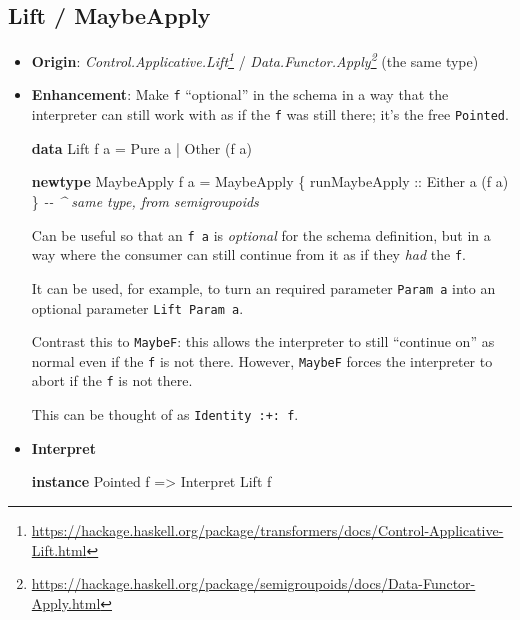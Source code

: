 \documentclass[]{article}
\newenvironment{Shaded}{}{}
\newcommand{\CommentTok}[1]{\textcolor[rgb]{0.38,0.63,0.69}{\textit{#1}}}
\newcommand{\DataTypeTok}[1]{\textcolor[rgb]{0.56,0.13,0.00}{#1}}
\newcommand{\KeywordTok}[1]{\textcolor[rgb]{0.00,0.44,0.13}{\textbf{#1}}}
\newcommand{\NormalTok}[1]{#1}
\newcommand{\OperatorTok}[1]{\textcolor[rgb]{0.40,0.40,0.40}{#1}}
\newcommand{\OtherTok}[1]{\textcolor[rgb]{0.00,0.44,0.13}{#1}}
\renewcommand{\href}[2]{#2\footnote{\url{#1}}}
\begin{document}
\hypertarget{lift-maybeapply}{%
\subsection{Lift / MaybeApply}\label{lift-maybeapply}}

\begin{itemize}
\item
  \textbf{Origin}:
  \emph{\href{https://hackage.haskell.org/package/transformers/docs/Control-Applicative-Lift.html}{Control.Applicative.Lift}}
  /
  \emph{\href{https://hackage.haskell.org/package/semigroupoids/docs/Data-Functor-Apply.html}{Data.Functor.Apply}}
  (the same type)
\item
  \textbf{Enhancement}: Make \texttt{f} ``optional'' in the schema in a way that
  the interpreter can still work with as if the \texttt{f} was still there; it's
  the free \texttt{Pointed}.

\begin{Shaded}
\begin{Highlighting}[]
\KeywordTok{data} \DataTypeTok{Lift}\NormalTok{ f a }\OtherTok{=} \DataTypeTok{Pure}\NormalTok{  a}
              \OperatorTok{|} \DataTypeTok{Other}\NormalTok{ (f a)}

\KeywordTok{newtype} \DataTypeTok{MaybeApply}\NormalTok{ f a }\OtherTok{=} \DataTypeTok{MaybeApply}\NormalTok{ \{}\OtherTok{ runMaybeApply ::} \DataTypeTok{Either}\NormalTok{ a (f a) \}}
    \CommentTok{{-}{-} \^{} same type, from semigroupoids}
\end{Highlighting}
\end{Shaded}

  Can be useful so that an \texttt{f\ a} is \emph{optional} for the schema
  definition, but in a way where the consumer can still continue from it as if
  they \emph{had} the \texttt{f}.

  It can be used, for example, to turn an required parameter \texttt{Param\ a}
  into an optional parameter \texttt{Lift\ Param\ a}.

  Contrast this to \texttt{MaybeF}: this allows the interpreter to still
  ``continue on'' as normal even if the \texttt{f} is not there. However,
  \texttt{MaybeF} forces the interpreter to abort if the \texttt{f} is not
  there.

  This can be thought of as \texttt{Identity\ :+:\ f}.
\item
  \textbf{Interpret}

\begin{Shaded}
\begin{Highlighting}[]
\KeywordTok{instance} \DataTypeTok{Pointed}\NormalTok{ f }\OtherTok{=>} \DataTypeTok{Interpret} \DataTypeTok{Lift}\NormalTok{ f}


\end{Highlighting}
\end{Shaded}
\end{itemize}
\end{document}

